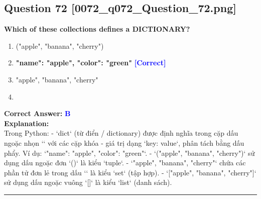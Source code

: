 \documentclass[11pt,a4paper]{article}
\begin{document}
\begin{minipage}{\textwidth}
\subsection*{Question 72 \quad \footnotesize{[0072_q072_Question_72.png]}}
\noindent \textbf{Which of these collections defines a DICTIONARY?}

\begin{enumerate}[label=\Alph*.]
    \item ("apple", "banana", "cherry")
    \item \textbf{"name": "apple", "color": "green"} \hfill \textcolor{blue}{\textbf{[Correct]}}
    \item "apple", "banana", "cherry"
    \item ["apple", "banana", "cherry"]
\end{enumerate}

\noindent \textbf{Correct Answer:} \textcolor{blue}{\textbf{B}} \\[4pt]
\noindent \textbf{Explanation:}\\
Trong Python:\newline
- `dict` (từ điển / dictionary) được định nghĩa trong cặp dấu ngoặc nhọn `{}` với các cặp khóa - giá trị dạng `key: value`, phân tách bằng dấu phẩy. Ví dụ: `{"name": "apple", "color": "green"}`.\newline
- `("apple", "banana", "cherry")` sử dụng dấu ngoặc đơn `()` là kiểu `tuple`.\newline
- `{"apple", "banana", "cherry"}` chứa các phần tử đơn lẻ trong dấu `{}` là kiểu `set` (tập hợp).\newline
- `["apple", "banana", "cherry"]` sử dụng dấu ngoặc vuông `[]` là kiểu `list` (danh sách).
\end{minipage}
\vspace{0.8cm}
\hrule
\vspace{0.5cm}
\end{document}
